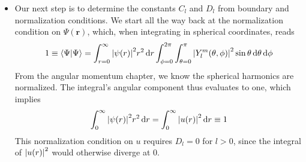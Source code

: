 \documentclass[11pt, a4paper]{article}
\newcommand{\diff}{\mathop{}\!\mathrm{d}} %
\renewcommand{\vec}[1]{\bm{#1}}  %
\renewcommand{\r}{\vec{r}}  %
\newcommand{\p}{\psi}  %
\renewcommand{\P}{\Psi}  %
\begin{document}
\begin{itemize}
	\item Our next step is to determine the constants $ C_{l} $ and $ D_{l} $ from boundary and normalization conditions. We start all the way back at the normalization condition on $ \P(\r) $, which, when integrating in spherical coordinates, reads
	\begin{equation*}
		1 \equiv \braket{\P}{\P} = \int_{r = 0}^{\infty}\abs{\p(r)}^{2}r^{2}\diff r \int_{\phi = 0}^{2\pi}\int_{\theta = 0}^{\pi}\abs{Y_{l}^{m}(\theta, \phi)}^{2}\sin \theta \diff \theta \diff \phi 
	\end{equation*}
	From the angular momentum chapter, we know the spherical harmonics are normalized. The integral's angular component thus evaluates to one, which implies
	\begin{equation*}
		\int_{ 0}^{\infty}\abs{\p(r)}^{2}r^{2}\diff r = \int_{0}^{\infty}\abs{u(r)}^{2}\diff r \equiv 1
	\end{equation*}
	This normalization condition on $ u $ requires $ D_{l} = 0 $ for $ l > 0 $, since the integral of $ \abs{u(r)}^{2} $ would otherwise diverge at $ 0 $. 
	

\end{itemize}
\end{document}
